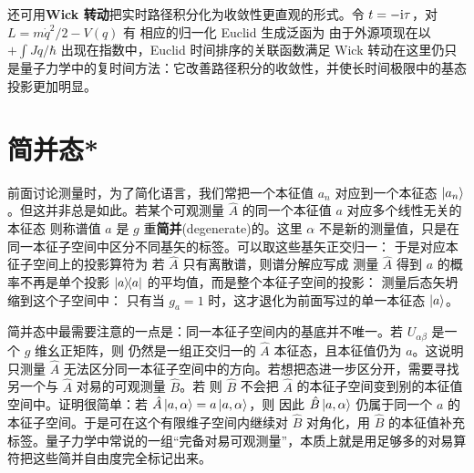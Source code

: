 还可用\textbf{Wick 转动}把实时路径积分化为收敛性更直观的形式。令 $t=-\mathrm{i}\tau$，对 $L=m\dot q^2/2-V(q)$ 有
相应的归一化 Euclid 生成泛函为
由于外源项现在以 $+\int Jq/\hbar$ 出现在指数中，Euclid 时间排序的关联函数满足
Wick 转动在这里仍只是量子力学中的复时间方法：它改善路径积分的收敛性，并使长时间极限中的基态投影更加明显。




\section{简并态*}
前面讨论测量时，为了简化语言，我们常把一个本征值 $a_n$ 对应到一个本征态 $\ket{a_n}$。但这并非总是如此。若某个可观测量 $\hat A$ 的同一个本征值 $a$ 对应多个线性无关的本征态
则称谱值 $a$ 是 $g$ 重\textbf{简并}(degenerate)的。这里 $\alpha$ 不是新的测量值，只是在同一本征子空间中区分不同基矢的标签。可以取这些基矢正交归一：
于是对应本征子空间上的投影算符为
若 $\hat A$ 只有离散谱，则谱分解应写成
测量 $\hat A$ 得到 $a$ 的概率不再是单个投影 $\op{a}$ 的平均值，而是整个本征子空间的投影：
测量后态矢坍缩到这个子空间中：
只有当 $g_a=1$ 时，这才退化为前面写过的单一本征态 $\ket a$。

简并态中最需要注意的一点是：同一本征子空间内的基底并不唯一。若 $U_{\alpha\beta}$ 是一个 $g$ 维幺正矩阵，则
仍然是一组正交归一的 $\hat A$ 本征态，且本征值仍为 $a$。这说明只测量 $\hat A$ 无法区分同一本征子空间中的方向。若想把态进一步区分开，需要寻找另一个与 $\hat A$ 对易的可观测量 $\hat B$。若
则 $\hat B$ 不会把 $\hat A$ 的本征子空间变到别的本征值空间中。证明很简单：若 $\hat A\ket{a,\alpha}=a\ket{a,\alpha}$，则
因此 $\hat B\ket{a,\alpha}$ 仍属于同一个 $a$ 的本征子空间。于是可在这个有限维子空间内继续对 $\hat B$ 对角化，用 $\hat B$ 的本征值补充标签。量子力学中常说的一组“完备对易可观测量”，本质上就是用足够多的对易算符把这些简并自由度完全标记出来。

